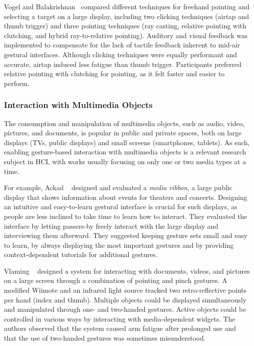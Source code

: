 Vogel and Balakrishnan~\cite{Vogel:2005} compared different techniques for freehand pointing and selecting a target on a large display, including two clicking techniques (airtap and thumb trigger) and three pointing techniques (ray casting, relative pointing with clutching, and hybrid ray-to-relative pointing). Auditory and visual feedback was implemented to compensate for the lack of tactile feedback inherent to mid-air gestural interfaces. Although clicking techniques were equally performant and accurate, airtap induced less fatigue than thumb trigger. Participants preferred relative pointing with clutching for pointing, as it felt faster and easier to perform.


\subsubsection{Interaction with Multimedia Objects}
The consumption and manipulation of multimedia objects, such as audio, video, pictures, and documents, is popular in public and private spaces, both on large displays (\eg TVs, public displays) and small screens (\eg smartphones, tablets). 
%
As such, enabling gesture-based interaction with multimedia objects is a relevant research subject in HCI, with works usually focusing on only one or two media types at a time.

For example, Ackad \etal~\cite{Ackad:2015} designed and evaluated a \textit{media ribbon}, a large public display that shows information about events for theaters and concerts. Designing an intuitive and easy-to-learn gestural interface is crucial for such displays, as people are less inclined to take time to learn how to interact. They evaluated the interface by letting passers-by freely interact with the large display and interviewing them afterward. They suggested keeping gesture sets small and easy to learn, \eg by always displaying the most important gestures and by providing context-dependent tutorials for additional gestures.

Vlaming \etal~\cite{Vlaming:2008} designed a system for interacting with documents, videos, and pictures on a large screen through a combination of pointing and pinch gestures. A modified Wiimote and an infrared light source tracked two retro-reflective points per hand (index and thumb). Multiple objects could be displayed simultaneously and manipulated through one- and two-handed gestures. Active objects could be controlled in various ways by interacting with media-dependent widgets. The authors observed that the system caused arm fatigue after prolonged use and that the use of two-handed gestures was sometimes misunderstood. 

